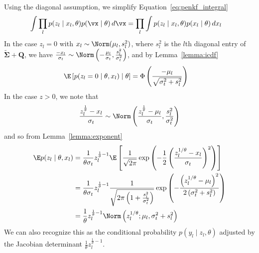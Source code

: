 \documentclass[12pt]{article}
\begin{document}
Using the diagonal assumption, we simplify Equation~\eqref{eq:penkf_integral}
\begin{align}
    \int \prod_l p(z_l \mid x_l, \theta)p(\vx \mid \theta)\,d\vx &= 
    \prod_l \int p(z_l \mid x_l,\theta)p(x_l \mid \theta)\,dx_l
\end{align}
In the case $z_l=0$ with $x_l \sim \Norm(\mu_l, s^2_l)$, where $s^2_l$ is the $l$th diagonal entry of $\tilde{\mathbf\Sigma} + \mathbf Q$, we have
$\frac{-x_l}{\sigma_t} \sim \Norm\left(-\frac{\mu_l}{\sigma_t},\frac{s_l^2}{\sigma_t^2}\right)$, and by 
Lemma~\ref{lemma:icdf}
\begin{align}
    \E\left[p(z_l=0 \mid \theta, x_l) \mid \theta\right] &= \Phi\left(\frac{-\mu_l}{\sqrt{\sigma_t^2+s_l^2}}\right)
\end{align}
In the case $z > 0$, we note that
\begin{align}
    \frac{z_l^{\frac 1 \theta} - x_l}{\sigma_t} 
        \sim \Norm\left(\frac{z_l^{\frac 1 \theta} - \mu_l}{\sigma_t}, \frac{s_l^2}{\sigma_t^2}\right)
\end{align}
and so from Lemma~\ref{lemma:exponent}
\begin{align}
    \E p(z_l \mid \theta, x_l)
    &= \frac{1}{\theta\sigma_t}z_l^{\frac 1 \theta - 1}
        \E\left[\frac{1}{\sqrt{2\pi}}\exp\left(-\frac 1 2 \left(\frac{z_l^{1/\theta}-x_l}{\sigma_t}\right)^2\right)\right] \\
    &= \frac{1}{\theta\sigma_t}z_l^{\frac 1 \theta - 1}
        \frac{1}{\sqrt{2\pi\left(1+\frac{s_l^2}{\sigma_t^2}\right)}}
        \exp\left(-\frac{\left(z_l^{1/\theta}-\mu_l\right)^2}{2\left(\sigma_t^2+s_l^2\right)}\right) \\
    &= \frac{1}{\theta}z_l^{\frac 1 \theta - 1}\Norm\left(z_l^{1/\theta};\mu_l,\sigma_t^2+s_l^2\right)
\end{align}
We can also recognize this as the conditional probability $p(y_l \mid z_l,\theta)$ adjusted by the
Jacobian determinant $\frac{1}{\theta}z_l^{\frac{1}{\theta}-1}$.

\end{document}
